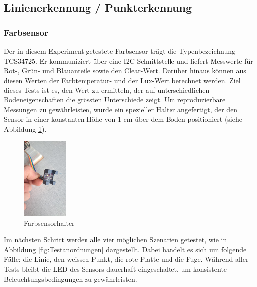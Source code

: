 \documentclass[../main.tex]{subfiles}
\begin{document}
\subsection{Linienerkennung / Punkterkennung}
\subsubsection{Farbsensor}
Der in diesem Experiment getestete Farbsensor trägt die Typenbezeichnung TCS34725. Er kommuniziert über eine I2C-Schnittstelle und liefert Messwerte für Rot-, Grün- und Blauanteile sowie den Clear-Wert. Darüber hinaus können aus diesen Werten der Farbtemperatur- und der Lux-Wert berechnet werden. Ziel dieses Tests ist es, den Wert zu ermitteln, der auf unterschiedlichen Bodeneigenschaften die grössten Unterschiede zeigt. Um reproduzierbare Messungen zu gewährleisten, wurde ein spezieller Halter angefertigt, der den Sensor in einer konstanten Höhe von 1 cm über dem Boden positioniert (siehe Abbildung \ref{fig:Farbsensorhalter}).

\begin{figure}[H] %
    \centering
    \includegraphics[width=0.2\textwidth]{img/sensortest/FarbsensorHalter.jpg} %
    \caption{Farbsensorhalter}
    \label{fig:Farbsensorhalter} %
\end{figure}

Im nächsten Schritt werden alle vier möglichen Szenarien getestet, wie in Abbildung \ref{fig:Testanordnungen} dargestellt. Dabei handelt es sich um folgende Fälle: die Linie, den weissen Punkt, die rote Platte und die Fuge. Während aller Tests bleibt die LED des Sensors dauerhaft eingeschaltet, um konsistente Beleuchtungsbedingungen zu gewährleisten.
\end{document}

